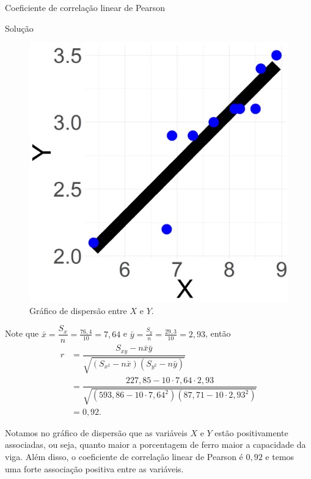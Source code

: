\documentclass[9pt]{beamer}
\begin{document}
\begin{frame}{Coeficiente de correlação linear de Pearson}

\begin{block}{Solução}
	\begin{minipage}{0.4\linewidth}
		\begin{figure}[htbp]
			\centering
			\caption{Gráfico de dispersão entre $X$ e $Y$.}
			\includegraphics[width=0.75\linewidth]{figures/exemplo2.png}
		\end{figure}
	\end{minipage}
	\begin{minipage}{0.4\linewidth}
		{\small
		\begin{flushleft}
			Note que $\bar{x} = \dfrac{S_x}{n}=\frac{76,4}{10}= 7,64$ e $\bar{y}=\frac{S_y}{n} = \frac{29,3}{10} = 2,93$, então
			\begin{align*}
			r &= \dfrac{S_{xy} - n \bar{x} \bar{y}}{\sqrt{(S_{x^2} - n \bar{x})(S_{y^2} - n \bar{y})}}\\
			&= \dfrac{227,85 - 10 \cdot 7,64 \cdot 2,93}{\sqrt{(593,86 - 10 \cdot 7,64^2) (87,71 - 10 \cdot 2,93^2)}}\\
			&= 0,92.
			\end{align*}
		\end{flushleft}
		}
	\end{minipage}

Notamos no gráfico de dispersão que as variáveis $X$ e $Y$ estão positivamente associadas, ou seja, quanto maior  a porcentagem de ferro maior a capacidade da viga. Além disso, o coeficiente de correlação linear de Pearson é $0,92$ e temos uma forte associação positiva entre as variáveis.
	
\end{block}

\end{frame}
\end{document}
